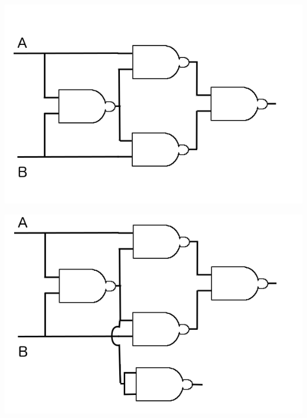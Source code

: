 \documentclass{article}
\begin{document}
	\begin{minipage}{.5\linewidth}
		\includegraphics[width=\linewidth]{figure/XOR1}
		\label{fig:XOR}
	\end{minipage}
	\begin{minipage}{.5\linewidth}
		\includegraphics[width=\linewidth]{figure/SOMMA1}
		\label{fig:XOR}
	\end{minipage}\newline
\end{document}
